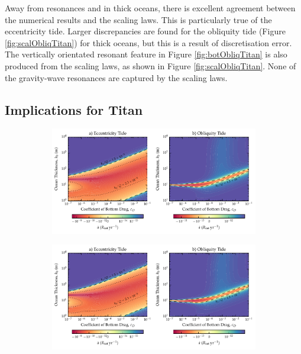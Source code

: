 Away from resonances and in thick oceans, there is excellent agreement between the numerical results and the scaling laws. This is particularly true of the eccentricity tide. Larger discrepancies are found for the obliquity tide (Figure \ref{fig:scalObliqTitan}) for thick oceans, but this is a result of discretisation error. The vertically orientated resonant feature in Figure \ref{fig:botObliqTitan} is also produced from the scaling laws, as shown in Figure \ref{fig:scalObliqTitan}. None of the gravity-wave resonances are captured by the scaling laws. 

\subsection{Implications for Titan}

\begin{figure}[!b]
    \centering
    \begin{subfigure}[t]{0.85\linewidth} %
        \includegraphics[width=\linewidth]{Figures/titan_adot}
        \label{fig:a_evo_ecc}
    \end{subfigure}
    \begin{subfigure}[t]{0\linewidth} %
         \includegraphics[width=\linewidth]{Figures/titan_adot}

\end{subfigure}
\end{figure}
